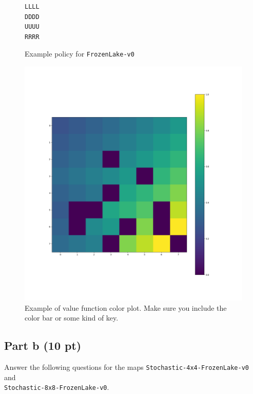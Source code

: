 \documentclass[12pt]{article}
\begin{document}
\begin{figure}[ht]
  \centering
  \begin{BVerbatim}
LLLL
DDDD
UUUU
RRRR
  \end{BVerbatim}
  \caption{\label{fig:prob2_example_policy} Example policy for \texttt{FrozenLake-v0}}
\end{figure}

\begin{figure}[ht]
  \centering
  \includegraphics[width=.5\textwidth]{figures/value_function_plot.png}
  \caption{\label{fig:prob3_value_image} Example of value function
    color plot. Make sure you include the color bar or some kind of key.}
\end{figure}


\subsection*{Part b (10 pt)}

Answer the following questions for the maps
\texttt{Stochastic-4x4-FrozenLake-v0} and \\
\texttt{Stochastic-8x8-FrozenLake-v0}.
\end{document}
